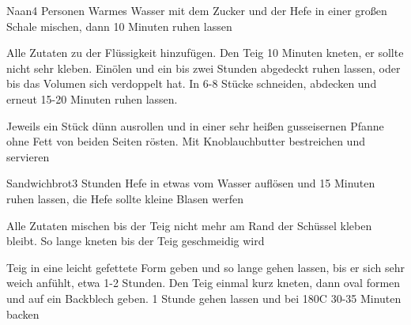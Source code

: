 
\begin{recipe}{Naan}{4 Personen}{}
Warmes Wasser mit dem Zucker und der Hefe in einer großen Schale mischen, dann 10 Minuten ruhen lassen

Alle Zutaten zu der Flüssigkeit hinzufügen. Den Teig 10 Minuten kneten, er sollte nicht sehr kleben.
Einölen und ein bis zwei Stunden abgedeckt ruhen lassen, oder bis das Volumen sich verdoppelt hat.
In 6-8 Stücke schneiden, abdecken und erneut 15-20 Minuten ruhen lassen.

Jeweils ein Stück dünn ausrollen und in einer sehr heißen gusseisernen Pfanne ohne Fett von beiden Seiten rösten.
Mit Knoblauchbutter bestreichen und servieren
\end{recipe}


\begin{recipe}{Sandwichbrot}{}{3 Stunden}
Hefe in etwas vom Wasser auflösen und 15 Minuten ruhen lassen, die Hefe sollte kleine Blasen werfen

Alle Zutaten mischen bis der Teig nicht mehr am Rand der Schüssel kleben bleibt. So lange kneten bis der Teig geschmeidig wird

\ing[]{}{}
Teig in eine leicht gefettete Form geben und so lange gehen lassen, bis er sich sehr weich anfühlt, etwa 1-2 Stunden. Den Teig einmal kurz kneten, dann oval formen und auf ein Backblech geben.
1 Stunde gehen lassen und bei 180\0C 30-35 Minuten backen
\end{recipe}


